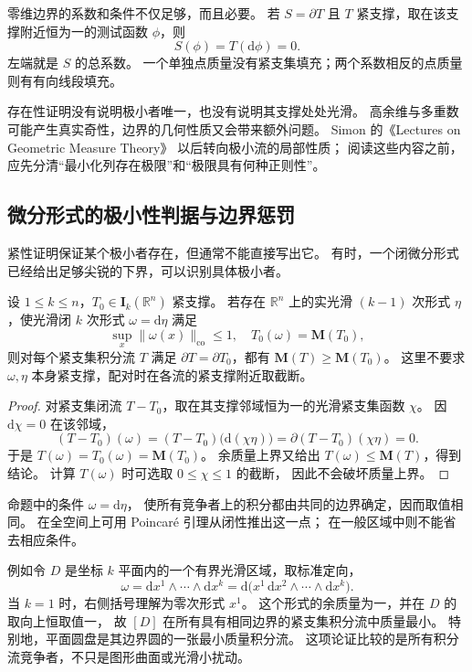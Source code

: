 零维边界的系数和条件不仅足够，而且必要。
若 \(S=\partial T\) 且 \(T\) 紧支撑，取在该支撑附近恒为一的测试函数 \(\phi\)，则
\[
 S(\phi)=T(\mathrm{d}\phi)=0.
\]
左端就是 \(S\) 的总系数。
一个单独点质量没有紧支集填充；两个系数相反的点质量则有有向线段填充。

\ProseParagraphBreak

存在性证明没有说明极小者唯一，也没有说明其支撑处处光滑。
高余维与多重数可能产生真实奇性，边界的几何性质又会带来额外问题。
Simon 的《Lectures on Geometric Measure Theory》%
\cite[\S33]{Simon1983Lectures}以后转向极小流的局部性质；
阅读这些内容之前，应先分清“最小化列存在极限”和“极限具有何种正则性”。

\subsection{微分形式的极小性判据与边界惩罚}
\label{b1:subsec:D10604}

紧性证明保证某个极小者存在，但通常不能直接写出它。
有时，一个闭微分形式已经给出足够尖锐的下界，可以识别具体极小者。

\begin{proposition}\label{b1:prop:app-d-closed-form-minimality}
设 \(1\leq k\leq n\)，\(T_0\in\mathbf I_k(\mathbb R^n)\) 紧支撑。
若存在 \(\mathbb R^n\) 上的实光滑 \((k-1)\) 次形式 \(\eta\)，使光滑闭 \(k\) 次形式
\(\omega=\mathrm{d}\eta\) 满足
\[
 \sup_x\|\omega(x)\|_{\mathrm{co}}\leq1,\quad
 T_0(\omega)=\mathbf M(T_0),
\]
则对每个紧支集积分流 \(T\) 满足 \(\partial T=\partial T_0\)，都有
\(\mathbf M(T)\geq\mathbf M(T_0)\)。
这里不要求 \(\omega,\eta\) 本身紧支撑，配对时在各流的紧支撑附近取截断。
\end{proposition}
\begin{proof}
对紧支集闭流 \(T-T_0\)，取在其支撑邻域恒为一的光滑紧支集函数 \(\chi\)。
因 \(\mathrm{d}\chi=0\) 在该邻域，
\[
 (T-T_0)(\omega)
    =(T-T_0)\bigl(\mathrm{d}(\chi\eta)\bigr)
    =\partial(T-T_0)(\chi\eta)=0.
\]
于是 \(T(\omega)=T_0(\omega)=\mathbf M(T_0)\)。
余质量上界又给出 \(T(\omega)\leq\mathbf M(T)\)，得到结论。
计算 \(T(\omega)\) 时可选取 \(0\leq\chi\leq1\) 的截断，
因此不会破坏质量上界。
\end{proof}

命题中的条件 \(\omega=\mathrm{d}\eta\)，
使所有竞争者上的积分都由共同的边界确定，因而取值相同。
在全空间上可用 Poincaré 引理从闭性推出这一点；
在一般区域中则不能省去相应条件。

\ProseParagraphBreak

例如令 \(D\) 是坐标 \(k\) 平面内的一个有界光滑区域，取标准定向，
\[
 \omega=\mathrm{d}x^1\wedge\cdots\wedge \mathrm{d}x^k
       =\mathrm{d}\bigl(x^1\,\mathrm{d}x^2\wedge\cdots\wedge \mathrm{d}x^k\bigr).
\]
当 \(k=1\) 时，右侧括号理解为零次形式 \(x^1\)。
这个形式的余质量为一，并在 \(D\) 的取向上恒取值一，
故 \([D]\) 在所有具有相同边界的紧支集积分流中质量最小。
特别地，平面圆盘是其边界圆的一张最小质量积分流。
这项论证比较的是所有积分流竞争者，不只是图形曲面或光滑小扰动。

